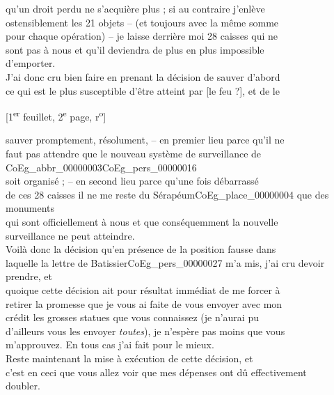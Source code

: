 \documentclass{book}
\begin{document}
qu’un droit perdu ne s’acquière plus ; si au contraire j’enlève\\
ostensiblement les 21 objets – (et toujours avec la même somme\\
pour chaque opération) – je laisse derrière moi 28 caisses qui ne\\
sont pas à nous et qu’il deviendra de plus en plus impossible\\
d’emporter.\\
\indent J’ai donc cru bien faire en prenant la décision de sauver d’abord\\
ce qui est le plus susceptible d’être atteint par {[le feu ?]}, et de le
{\footnotesize\begin{center} {[1\textsuperscript{er} feuillet, 2\textsuperscript{e} page, r\textsuperscript{o}]}\end{center}}
\noindent sauver promptement, résolument, – en premier lieu parce qu’il ne\\
faut pas attendre que le nouveau système de surveillance de \gls{CoEg_abbr_00000003}\gls{CoEg_pers_00000016}\\
soit organisé ; – en second lieu parce qu’une fois débarrassé\\
de ces 28 caisses il ne me reste du Sérapéum\gls{CoEg_place_00000004} que des monuments\\
qui sont officiellement à nous et que conséquemment la nouvelle\\
surveillance ne peut atteindre.\\
\indent Voilà donc la décision qu’en présence de la position fausse dans\\
laquelle la lettre de Batissier\gls{CoEg_pers_00000027} m’a mis, j’ai cru devoir prendre, et\\
quoique cette décision ait pour résultat immédiat de me forcer à\\
retirer la promesse que je vous ai faite de vous envoyer avec mon\\
crédit les grosses statues que vous connaissez (je n’aurai pu\\
d’ailleurs vous les envoyer \textit{toutes}), je n’espère pas moins que vous\\
m’approuvez. En tous cas j’ai fait pour le mieux.\\
\indent Reste maintenant la mise à exécution de cette décision, et\\
c’est en ceci que vous allez voir que mes dépenses ont dû effectivement\\
doubler.\\
\end{document}
